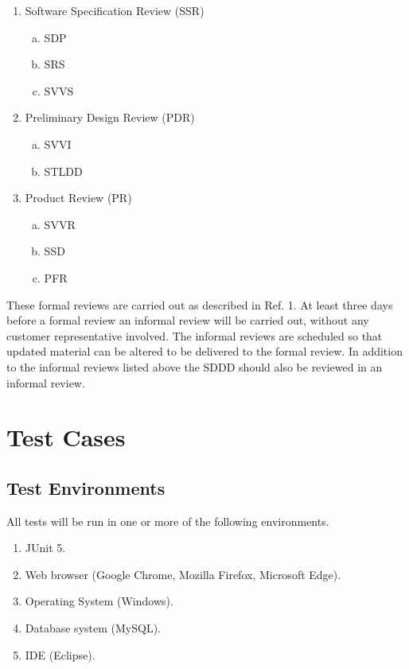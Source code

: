 \documentclass{article}
\begin{document}
\begin{enumerate}
	\item Software Specification Review (SSR)
		\begin{enumerate}[a.] 
			\item SDP
			\item SRS 
			\item SVVS 
		\end{enumerate}
	\item Preliminary Design Review (PDR) 
		\begin{enumerate}[a.]
			\item SVVI
			\item STLDD
		\end{enumerate}
	\item Product Review (PR) 
		\begin{enumerate}[a.]
			\item SVVR 
			\item SSD 
			\item PFR 
		\end{enumerate}
\end{enumerate}

\noindent
These formal reviews are carried out as described in Ref. 1. At least three days before a formal review an informal review will be carried out, without any customer representative involved. The informal reviews are scheduled so that updated material can be altered to be delivered to the formal review. In addition to the informal reviews listed above the SDDD should also be reviewed in an informal review. 

\section{Test Cases}
	\subsection{Test Environments}
	All tests will be run in one or more of the following environments. 
		\begin{enumerate}
			\item JUnit 5.

			\item Web browser (Google Chrome, Mozilla Firefox, Microsoft Edge).

			\item Operating System (Windows).

			\item Database system (MySQL).

			\item IDE (Eclipse).	
		\end{enumerate}
		
\end{document}
